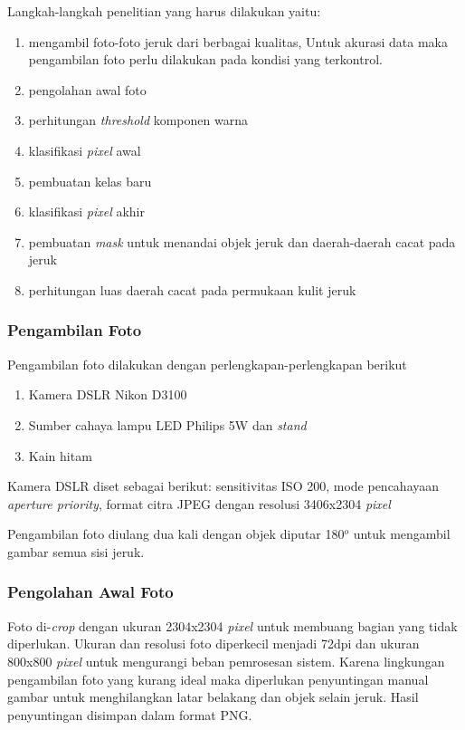\documentclass[laporan.tex]{subfiles}
\begin{document}
Langkah-langkah penelitian yang harus dilakukan yaitu:

\begin{enumerate}
\item mengambil foto-foto jeruk dari berbagai kualitas, Untuk akurasi data maka pengambilan foto perlu dilakukan pada kondisi yang terkontrol.
\item pengolahan awal foto
\item perhitungan \emph{threshold} komponen warna
\item klasifikasi \emph{pixel} awal
\item pembuatan kelas baru
\item klasifikasi \emph{pixel} akhir
\item pembuatan \emph{mask} untuk menandai objek jeruk dan daerah-daerah cacat pada jeruk
\item perhitungan luas daerah cacat pada permukaan kulit jeruk
\end{enumerate}

\subsubsection{Pengambilan Foto} \label{photoshoot}

Pengambilan foto dilakukan dengan perlengkapan-perlengkapan berikut

\begin{enumerate}
\item Kamera DSLR Nikon D3100
\item Sumber cahaya lampu LED Philips 5W dan \emph{stand}
\item Kain hitam
\end{enumerate}

Kamera DSLR diset sebagai berikut: sensitivitas ISO 200, mode pencahayaan \emph{aperture priority}, format citra JPEG dengan resolusi 3406x2304 \emph{pixel}


Pengambilan foto diulang dua kali dengan objek diputar 180$^o$ untuk mengambil gambar semua sisi jeruk.

\subsubsection{Pengolahan Awal Foto}

Foto di-\emph{crop} dengan ukuran 2304x2304 \emph{pixel} untuk membuang bagian yang tidak diperlukan. Ukuran dan resolusi foto diperkecil menjadi 72dpi dan ukuran 800x800 \emph{pixel} untuk mengurangi beban pemrosesan sistem. Karena lingkungan pengambilan foto yang kurang ideal maka diperlukan penyuntingan manual gambar untuk menghilangkan latar belakang dan objek selain jeruk. Hasil penyuntingan disimpan dalam format PNG.
\end{document}
